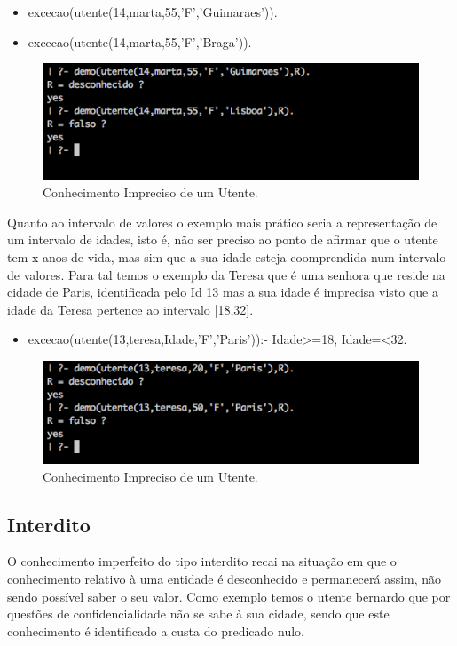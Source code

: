 \documentclass[25pt]{article}
\begin{document}
\begin{itemize}
\item excecao(utente(14,marta,55,'F','Guimaraes')).
\item excecao(utente(14,marta,55,'F','Braga')).
\end{itemize}

\begin{figure}[H]
\centering\includegraphics[scale=0.55]{impreciso1}
\caption{\label{fig:controller}Conhecimento Impreciso de um Utente.}
\end{figure}

Quanto ao intervalo de valores o exemplo mais prático seria a representação de um intervalo de idades, isto é, não ser preciso ao ponto 
de afirmar que o utente tem x anos de vida, mas sim que a sua idade esteja coomprendida num intervalo de valores.
Para tal temos o exemplo da Teresa que é uma senhora que reside na cidade de Paris, identificada pelo Id 13 mas a sua idade é imprecisa visto que
a idade da Teresa pertence ao intervalo [18,32].
\begin{itemize}
\item excecao(utente(13,teresa,Idade,'F','Paris')):- Idade>=18,
                        Idade=<32.
\end{itemize}

\begin{figure}[H]
\centering\includegraphics[scale=0.55]{impreciso2}
\caption{\label{fig:controller}Conhecimento Impreciso de um Utente.}
\end{figure}

\subsection{Interdito}
O conhecimento imperfeito do tipo interdito recai na situação em que o conhecimento relativo à uma entidade é desconhecido e permanecerá 
assim, não sendo possível saber o seu valor.\newline
Como exemplo temos o utente bernardo que por questões de confidencialidade não se sabe à sua cidade, sendo que este conhecimento é identificado
a custa do predicado nulo.
\end{document}
